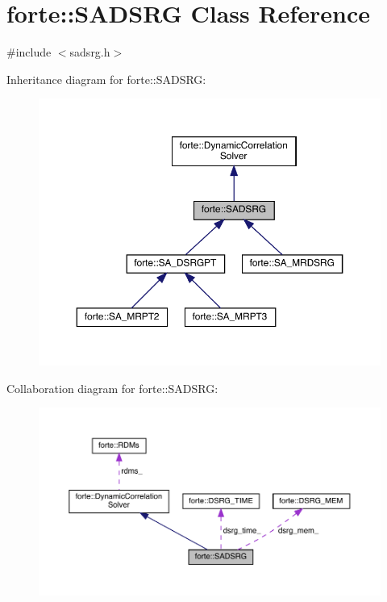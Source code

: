 \hypertarget{classforte_1_1_s_a_d_s_r_g}{}\section{forte\+:\+:S\+A\+D\+S\+RG Class Reference}
\label{classforte_1_1_s_a_d_s_r_g}


{\ttfamily \#include $<$sadsrg.\+h$>$}



Inheritance diagram for forte\+:\+:S\+A\+D\+S\+RG\+:
\nopagebreak
\begin{figure}[H]
\begin{center}
\leavevmode
\includegraphics[width=350pt]{classforte_1_1_s_a_d_s_r_g__inherit__graph}
\end{center}
\end{figure}


Collaboration diagram for forte\+:\+:S\+A\+D\+S\+RG\+:
\nopagebreak
\begin{figure}[H]
\begin{center}
\leavevmode
\includegraphics[width=350pt]{classforte_1_1_s_a_d_s_r_g__coll__graph}
\end{center}
\end{figure}
